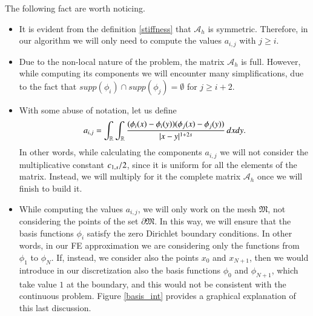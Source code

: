 \begin{remark}\label{rem_prel}
The following fact are worth noticing.
\begin{itemize}
	\item It is evident from the definition \eqref{stiffness} that $\mathcal A_h$ is symmetric. Therefore, in our algorithm we will only need to compute the values $a_{i,j}$ with $j\geq i$.
	
	\item Due to the non-local nature of the problem, the matrix $\mathcal A_h$ is full. However, while computing its components we will encounter many simplifications, due to the fact that $supp(\phi_i)\cap supp(\phi_j) =\emptyset$ for $j\geq i+2$.
	
	\item With some abuse of notation, let us define 
	\begin{align}\label{stiffness_nc}
	a_{i,j}= \int_{\mathbb{R}}\int_{\mathbb{R}}\frac{(\phi_i(x)-\phi_i(y))(\phi_j(x)-\phi_j(y))}{|x-y|^{1+2s}}\,dxdy.
\end{align}
	In other words, while calculating the components $a_{i,j}$ we will not consider the multiplicative constant $c_{1,s}/2$, since it is uniform for all the elements of the matrix. Instead, we will multiply for it the complete matrix $\mathcal A_h$ once we will finish to build it.
	
	\item While computing the values $a_{i,j}$, we will only work on the mesh $\mathfrak{M}$, not considering the points of the set $\partial\mathfrak{M}$. In this way, we will ensure that the basis functions $\phi_i$ satisfy the zero Dirichlet boundary conditions. In other words, in our FE approximation we are considering only the functions from $\phi_1$ to $\phi_N$. If, instead, we consider also the points $x_0$ and $x_{N+1}$, then we would introduce in our discretization also the basis functions $\phi_0$ and $\phi_{N+1}$, which take value $1$ at the boundary, and this would not be consistent with the continuous problem. Figure \ref{basis_int} provides a graphical explanation of this last discussion.      	
\end{itemize}
\end{remark}


